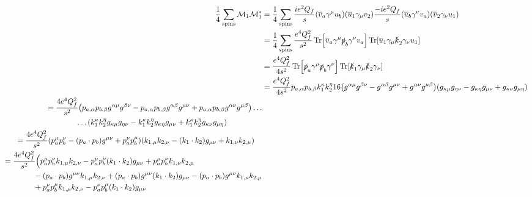 \documentclass[12 pt,draft]{article}
\renewcommand{\b}[1]{\overline{#1}}
\newcommand{\trexp}[4]{g^{#1#2}g^{#3#4}-g^{#1#3}g^{#2#4}+g^{#1#4}g^{#2#3}}
\newcommand{\trexplow}[4]{g_{#1#2}g_{#3#4}-g_{#1#3}g_{#2#4}+g_{#1#4}g_{#2#3}}
\begin{document}
\begin{problem}[ $\mu\b{\mu}\rightarrow f\b{f}$]
		\begin{align}
			\oo{4}\sum_\text{spins}\mathcal{M}_1\mathcal{M}_1^*
			&=\oo{4}\sum_\text{spins}
			\frac{ie^2Q_f}{s}
			\qty(\b{v}_a\gamma^\mu u_b)
			\qty(\b{u}_1\gamma_\mu v_2)
			\frac{-ie^2Q_f}{s}
			\qty(\b{u}_b\gamma^\nu v_a)
			\qty(\b{v}_2\gamma_\nu u_1)
			\\
			&=\oo{4}\sum_\text{spins}
			\frac{e^4Q_f^2}{s^2}
			\Tr[\b{v}_a\gamma^\mu \slsh{p}_b\gamma^\nu v_a]
			\Tr[\b{u}_1\gamma_\mu \slsh{k}_2\gamma_\nu u_1]
			\\
			&=
			\frac{e^4Q_f^2}{4s^2}
			\Tr[\slsh{p}_a\gamma^\mu \slsh{p}_b\gamma^\nu]
			\Tr[\slsh{k}_1\gamma_\mu \slsh{k}_2\gamma_\nu]\label{eqn:first_trace_product}
			\\
			&=\frac{e^4Q_f^2}{4s^2}
			p_{a,\alpha}p_{b,\beta}
			k_1^{\kappa}k_2^{\eta}16
			\qty(\trexp{\alpha}{\mu}{\beta}{\nu})
			\qty(\trexplow{\kappa}{\mu}{\eta}{\nu})
			\\
			\begin{split}
				&=\frac{4e^4Q_f^2}{s^2}
				\qty(
					p_{a,\alpha}p_{b,\beta}g^{\alpha\mu} g^{\beta\nu}
					-p_{a,\alpha}p_{b,\beta}g^{\alpha\beta} g^{\mu\nu}
					+p_{a,\alpha}p_{b,\beta}g^{\alpha\nu} g^{\mu\beta})
				\ldots\\&\qquad\qquad\ldots
				\qty(
					k_1^{\kappa}k_2^{\eta}g_{\kappa\mu} g_{\eta\nu}
					-k_1^{\kappa}k_2^{\eta}g_{\kappa\eta}g_{\mu\nu}
					+k_1^{\kappa}k_2^{\eta}g_{\kappa\nu} g_{\mu\eta})
			\end{split}
			\\
			\begin{split}
				&=\frac{4e^4Q_f^2}{s^2}
				\qty(
					p_a^{\mu}p_b^{\nu}
					-\qty(p_a\cdot p_b)g^{\mu\nu}
					+p_a^{\nu}p_b^{\mu}
					)
				\qty(
					k_{1,\mu}k_{2,\nu}
					-\qty(k_1\cdot k_2)g_{\mu\nu}
					+k_{1,\nu}k_{2,\mu}
					)
			\end{split}
			\\
			\begin{split}
				&=\frac{4e^4Q_f^2}{s^2}
				\Big(
					p_a^{\mu}p_b^{\nu}k_{1,\mu}k_{2,\nu}
					-p_a^{\mu}p_b^{\nu}\qty(k_1\cdot k_2)g_{\mu\nu}
					+p_a^{\mu}p_b^{\nu}k_{1,\nu}k_{2,\mu}
					\\&\qquad\qquad
					-\qty(p_a\cdot p_b)g^{\mu\nu}k_{1,\mu}k_{2,\nu}
					+\qty(p_a\cdot p_b)g^{\mu\nu}\qty(k_1\cdot k_2)g_{\mu\nu}
					-\qty(p_a\cdot p_b)g^{\mu\nu}k_{1,\nu}k_{2,\mu}
					\\&\qquad\qquad
					+p_a^{\nu}p_b^{\mu}k_{1,\mu}k_{2,\nu}
					-p_a^{\nu}p_b^{\mu}\qty(k_1\cdot k_2)g_{\mu\nu}

\end{split}
\end{align}
\end{problem}
\end{document}
